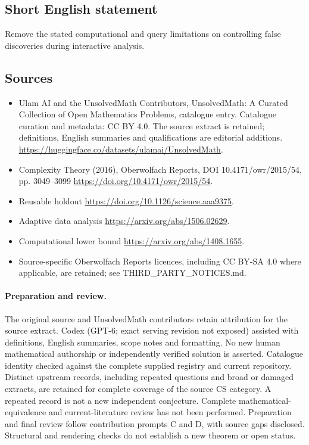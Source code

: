 \documentclass[11pt]{article}
\begin{document}
\subsection{Short English statement}
Remove the stated computational and query limitations on controlling false discoveries during interactive analysis.
\subsection{Sources}
\begin{itemize}
\item[\hypertarget{source:statement:1}{S1}] Ulam AI and the UnsolvedMath Contributors, UnsolvedMath: A Curated Collection of Open Mathematics Problems, catalogue entry. Catalogue curation and metadata: CC BY 4.0. The source extract is retained; definitions, English summaries and qualifications are editorial additions.
\url{https://huggingface.co/datasets/ulamai/UnsolvedMath}.
\item[\hypertarget{source:statement:2}{S2}] Complexity Theory (2016), Oberwolfach Reports, DOI 10.4171/owr/2015/54, pp. 3049--3099
\url{https://doi.org/10.4171/owr/2015/54}.
\item[\hypertarget{source:statement:3}{S3}] Reusable holdout
\url{https://doi.org/10.1126/science.aaa9375}.
\item[\hypertarget{source:statement:4}{S4}] Adaptive data analysis
\url{https://arxiv.org/abs/1506.02629}.
\item[\hypertarget{source:statement:5}{S5}] Computational lower bound
\url{https://arxiv.org/abs/1408.1655}.
\item Source-specific Oberwolfach Reports licences, including CC BY-SA 4.0 where applicable, are retained; see THIRD\_PARTY\_NOTICES.md.
\end{itemize}
\paragraph{Preparation and review.}
The original source and UnsolvedMath contributors retain attribution for the source extract. Codex (GPT-6; exact serving revision not exposed) assisted with definitions, English summaries, scope notes and formatting. No new human mathematical authorship or independently verified solution is asserted. Catalogue identity checked against the complete supplied registry and current repository. Distinct upstream records, including repeated questions and broad or damaged extracts, are retained for complete coverage of the source CS category. A repeated record is not a new independent conjecture. Complete mathematical-equivalence and current-literature review has not been performed. Preparation and final review follow contribution prompts C and D, with source gaps disclosed. Structural and rendering checks do not establish a new theorem or open status.
\label{end:statement}
\end{document}
